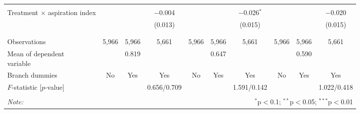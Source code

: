 \begin{table}[!htbp]
\begin{tabular}{@{\extracolsep{5pt}}lccccccccc}
  & & & & & & & & & \\ 
 \makecell[l]{Treatment $\times$ aspiration\\\hspace{1em}index} &  &  & $-$0.004 &  &  & $-$0.026$^{*}$ &  &  & $-$0.020 \\ 
  &  &  & (0.013) &  &  & (0.015) &  &  & (0.015) \\ 
  & & & & & & & & & \\ 
\hline \\[-1.8ex] 
Observations & 5,966 & 5,966 & 5,661 & 5,966 & 5,966 & 5,661 & 5,966 & 5,966 & 5,661 \\ 
\makecell[l]{Mean of dependent\\\hspace{1em}variable} &  & 0.819 &  &  & 0.647 &  &  & 0.590 &  \\ 
Branch dummies & No & Yes & Yes & No & Yes & Yes & No & Yes & Yes \\ 
$F$-statistic [$p$-value] &   &   & 0.656/0.709 &   &   & 1.591/0.142 &   &   & 1.022/0.418 \\ 
\hline \\[-1.8ex] 
\textit{Note:}  & \multicolumn{9}{r}{$^{*}$p$<$0.1; $^{**}$p$<$0.05; $^{***}$p$<$0.01} \\ 
\end{tabular} 
\end{table} 
